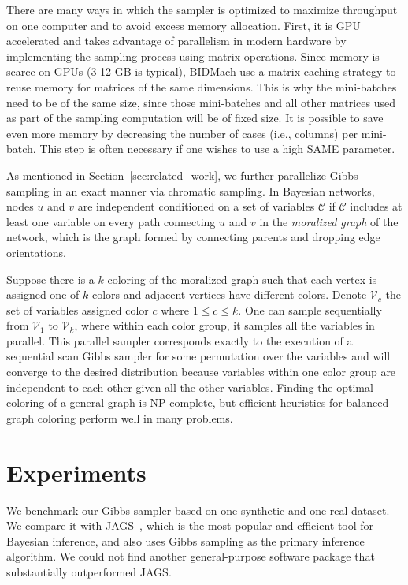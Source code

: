 \documentclass{article} %
\begin{document}
There are many ways in which the sampler is optimized to maximize throughput on one computer and to
avoid excess memory allocation. First, it is GPU accelerated and takes advantage of parallelism in
modern hardware by implementing the sampling process using matrix operations. Since memory is scarce
on GPUs (3-12 GB is typical), BIDMach use a matrix caching strategy to reuse memory for matrices of
the same dimensions. This is why the mini-batches need to be of the same size, since those
mini-batches and all other matrices used as part of the sampling computation will be of fixed size.
It is possible to save even more memory by decreasing the number of cases (i.e., columns) per
mini-batch. This step is often necessary if one wishes to use a high SAME parameter.

As mentioned in Section~\ref{sec:related_work}, we further parallelize Gibbs sampling in an
exact manner via chromatic sampling. In Bayesian networks, nodes $u$ and $v$ are independent
conditioned on a set of variables $\mathcal{C}$ if $\mathcal{C}$ includes at least one variable on
every path connecting $u$ and $v$ in the \emph{moralized graph} of the network, which is the graph
formed by connecting parents and dropping edge orientations.

Suppose there is a $k$-coloring of the moralized graph such that each vertex is assigned one of $k$
colors and adjacent vertices have different colors. Denote $\mathcal{V}_c$ the set of variables
assigned color $c$ where $1 \leq c \leq k$. One can sample sequentially from $\mathcal{V}_1$ to
$\mathcal{V}_k$, where within each color group, it samples all the variables in parallel. This
parallel sampler corresponds exactly to the execution of a sequential scan Gibbs sampler for some
permutation over the variables and will converge to the desired distribution because variables
within one color group are independent to each other given all the other variables. Finding the
optimal coloring of a general graph is NP-complete, but efficient heuristics for balanced graph
coloring perform well in many problems.




\section{Experiments}\label{sec:experiments}

We benchmark our Gibbs sampler based on one synthetic and one real dataset. We compare it with
JAGS~\citep{JAGS2003}, which is the most popular and efficient tool for Bayesian inference, and also
uses Gibbs sampling as the primary inference algorithm. We could not find another general-purpose
software package that substantially outperformed JAGS. %
\end{document}
